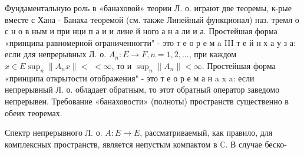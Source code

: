 \documentclass[10pt]{article}
\begin{document}
Фундаментальную роль в «банаховой» теории Л. о. играют две теоремы, к-рые вместе с Хана - Банаха теоремой (см. также Линейный функционал) наз. тремл о с н о в ным и при нци п а и и лине й ного а н а ли и а. Простейшая форма «принципа равномерной ограниченногти" - это т е о р е м a III т е й н х а у з а: если для непрерывных Л. о. $A_{n}: E \rightarrow F, n=1,2, \ldots$, при каждом $x \in E \sup _{n}\left\|A_{n} x\right\|<$ $<\infty$, то и $\sup _{n}\left\|A_{n}\right\|<\infty$. Простейшая форма «принципа открытости отображения" - это т е о р е м а н a x a: если непрерывный Л. о. обладает обратным, то этот обратный оператор заведомо непрерывен. Требование «банаховости» (полноты) пространств существенно в обеих теоремах.



Спектр непрерывного Л. о. $A: E \rightarrow E$, рассматриваемый, как правило, для комплексных пространств, является непустым компактом в $\mathbb{C}$. В случае беско-
\end{document}
